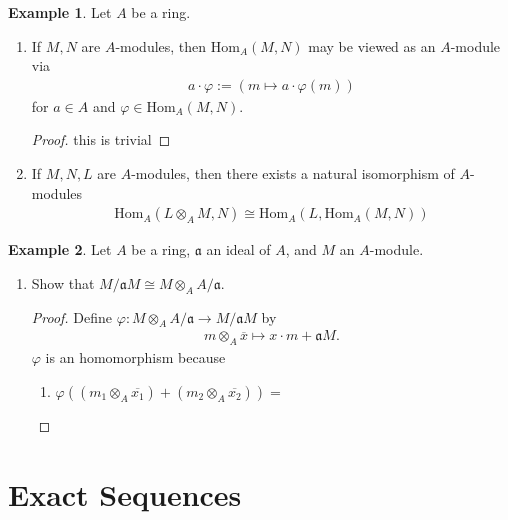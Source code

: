 \documentclass[a4paper]{book}
\theoremstyle{definition}
\newtheorem{example}{Example}[definition]
\begin{document}
\begin{example}
    Let \(A\) be a ring.
    \begin{enumerate}
        \item If \(M, N\) are \(A\)-modules, then \(\mathrm{Hom}_A(M, N)\) may be viewed as an \(A\)-module via
        \begin{align*}
            a \cdot \varphi := (m \mapsto a \cdot \varphi(m))
        \end{align*}
        for \(a \in A\) and \(\varphi \in \mathrm{Hom}_A(M, N)\).

        \begin{proof}
            this is trivial
        \end{proof}
        \item If \(M, N, L\) are \(A\)-modules, then there exists a natural isomorphism of \(A\)-modules
        \begin{align*}
            \mathrm{Hom}_A(L \otimes_A M, N) \cong \mathrm{Hom}_A(L, \mathrm{Hom}_A(M, N))
        \end{align*}
    \end{enumerate}
\end{example}

\begin{example}
    Let \(A\) be a ring, \(\mathfrak{a}\) an ideal of \(A\), and \(M\) an \(A\)-module.
    \begin{enumerate}
        \item Show that \(M / \mathfrak{a} M \cong M \otimes_A A / \mathfrak{a}\).
        \begin{proof}
            Define \(\varphi: M \otimes_A A / \mathfrak{a} \rightarrow M / \mathfrak{a}M \) by
            \begin{align*}
                m \otimes_A \overline{x} \mapsto x \cdot m + \mathfrak{a}M \text{.}
            \end{align*}
            \(\varphi\) is an homomorphism because
            \begin{enumerate}
                \item \(\varphi((m_1 \otimes_A \overline{x_1}) + (m_2 \otimes_A \overline{x_2})) = \)
            \end{enumerate}
        \end{proof}
    \end{enumerate}
\end{example}

\chapter{Exact Sequences}
\end{document}
